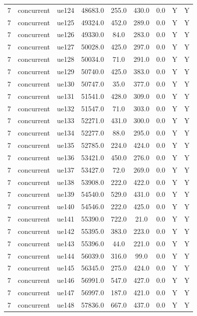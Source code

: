 \begin{table}[ht]
\begin{tabular}{|c|c|c|c|c|c|c|c|c|}
7 & concurrent & ue124 & 48683.0 & 255.0 & 430.0 & 0.0 & Y & Y \\
7 & concurrent & ue125 & 49324.0 & 452.0 & 289.0 & 0.0 & Y & Y \\
7 & concurrent & ue126 & 49330.0 & 84.0 & 283.0 & 0.0 & Y & Y \\
7 & concurrent & ue127 & 50028.0 & 425.0 & 297.0 & 0.0 & Y & Y \\
7 & concurrent & ue128 & 50034.0 & 71.0 & 291.0 & 0.0 & Y & Y \\
7 & concurrent & ue129 & 50740.0 & 425.0 & 383.0 & 0.0 & Y & Y \\
7 & concurrent & ue130 & 50747.0 & 35.0 & 377.0 & 0.0 & Y & Y \\
7 & concurrent & ue131 & 51541.0 & 428.0 & 309.0 & 0.0 & Y & Y \\
7 & concurrent & ue132 & 51547.0 & 71.0 & 303.0 & 0.0 & Y & Y \\
7 & concurrent & ue133 & 52271.0 & 431.0 & 300.0 & 0.0 & Y & Y \\
7 & concurrent & ue134 & 52277.0 & 88.0 & 295.0 & 0.0 & Y & Y \\
7 & concurrent & ue135 & 52785.0 & 224.0 & 424.0 & 0.0 & Y & Y \\
7 & concurrent & ue136 & 53421.0 & 450.0 & 276.0 & 0.0 & Y & Y \\
7 & concurrent & ue137 & 53427.0 & 72.0 & 269.0 & 0.0 & Y & Y \\
7 & concurrent & ue138 & 53908.0 & 222.0 & 422.0 & 0.0 & Y & Y \\
7 & concurrent & ue139 & 54540.0 & 529.0 & 431.0 & 0.0 & Y & Y \\
7 & concurrent & ue140 & 54546.0 & 222.0 & 425.0 & 0.0 & Y & Y \\
7 & concurrent & ue141 & 55390.0 & 722.0 & 21.0 & 0.0 & Y & Y \\
7 & concurrent & ue142 & 55395.0 & 383.0 & 223.0 & 0.0 & Y & Y \\
7 & concurrent & ue143 & 55396.0 & 44.0 & 221.0 & 0.0 & Y & Y \\
7 & concurrent & ue144 & 56039.0 & 316.0 & 99.0 & 0.0 & Y & Y \\
7 & concurrent & ue145 & 56345.0 & 275.0 & 424.0 & 0.0 & Y & Y \\
7 & concurrent & ue146 & 56991.0 & 547.0 & 427.0 & 0.0 & Y & Y \\
7 & concurrent & ue147 & 56997.0 & 187.0 & 421.0 & 0.0 & Y & Y \\
7 & concurrent & ue148 & 57836.0 & 667.0 & 437.0 & 0.0 & Y & Y \\

\end{tabular}
\end{table}
